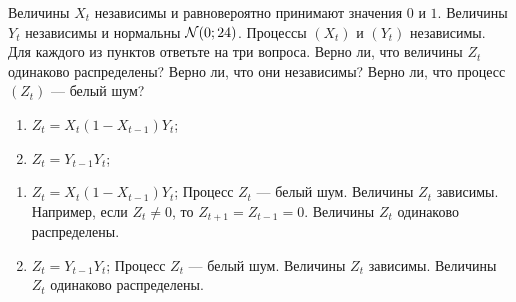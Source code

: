 \begin{problem}
Величины $X_t$ независимы и равновероятно принимают значения $0$ и $1$. Величины $Y_t$ независимы и нормальны $\mathcal{N}(0;24)$.
Процессы $(X_t)$ и $(Y_t)$ независимы. Для каждого из пунктов ответьте на три вопроса. Верно ли, что величины $Z_t$ одинаково распределены? Верно ли, что они независимы? Верно ли, что процесс $(Z_t)$ — белый шум? 
\begin{enumerate}
  \item $Z_t = X_t (1-X_{t-1})Y_t$;  
\item $Z_t = Y_{t-1}Y_t$;
\end{enumerate}
\begin{sol}

\begin{enumerate}
  \item $Z_t = X_t (1-X_{t-1})Y_t$;  
  Процесс $Z_t$ — белый шум. Величины $Z_t$ зависимы. Например, если $Z_t \neq 0$, то $Z_{t+1}=Z_{t-1}=0$. Величины $Z_t$ одинаково распределены.
\item $Z_t = Y_{t-1}Y_t$; 
Процесс $Z_t$ — белый шум. Величины $Z_t$ зависимы. Величины $Z_t$ одинаково распределены.
\end{enumerate}


\end{sol}
\end{problem}




